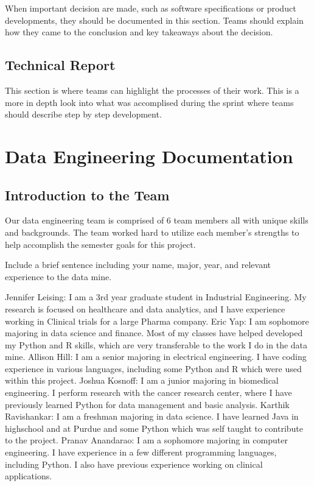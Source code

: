 \documentclass[]{book}
\begin{document}
When important decision are made, such as software specifications or
product developments, they should be documented in this section. Teams
should explain how they came to the conclusion and key takeaways about
the decision.

\section{Technical Report}\label{technical-report}

This section is where teams can highlight the processes of their work.
This is a more in depth look into what was accomplised during the sprint
where teams should describe step by step development.

\chapter{Data Engineering
Documentation}\label{data-engineering-documentation}

\section{Introduction to the Team}\label{introduction-to-the-team}

Our data engineering team is comprised of 6 team members all with unique
skills and backgrounds. The team worked hard to utilize each member's
strengths to help accomplish the semester goals for this project.

Include a brief sentence including your name, major, year, and relevant
experience to the data mine.

Jennifer Leising: I am a 3rd year graduate student in Industrial
Engineering. My research is focused on healthcare and data analytics,
and I have experience working in Clinical trials for a large Pharma
company. Eric Yap: I am sophomore majoring in data science and finance.
Most of my classes have helped developed my Python and R skills, which
are very transferable to the work I do in the data mine. Allison Hill: I
am a senior majoring in electrical engineering. I have coding experience
in various languages, including some Python and R which were used within
this project. Joshua Kosnoff: I am a junior majoring in biomedical
engineering. I perform research with the cancer research center, where I
have previously learned Python for data management and basic analysis.
Karthik Ravishankar: I am a freshman majoring in data science. I have
learned Java in highschool and at Purdue and some Python which was self
taught to contribute to the project. Pranav Anandarao: I am a sophomore
majoring in computer engineering. I have experience in a few different
programming languages, including Python. I also have previous experience
working on clinical applications.
\end{document}
